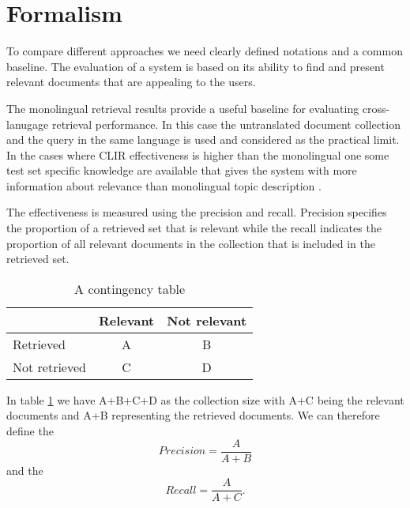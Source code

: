 \documentclass[journal]{IEEEtran}
\begin{document}
\section{Formalism}
To compare different approaches we need clearly defined notations and a common baseline.
The evaluation of a system is based on its ability to find and present relevant documents that are appealing to the users.

The monolingual retrieval results provide a useful baseline for evaluating cross-lanugage retrieval performance.
In this case the untranslated document collection and the query in the same language is used and considered as the practical limit.
In the cases where CLIR effectiveness is higher than the monolingual one some test set specific knowledge are available that gives the system with more information about relevance than monolingual topic description \cite{xu00}.

The effectiveness is measured using the precision and recall.
Precision specifies the proportion of a retrieved set that is relevant while the recall indicates the proportion of all relevant documents in the collection that is included in the retrieved set.

\begin{table}[h]
\caption{A contingency table}
\label{contTable}
\begin{center}
\begin{tabular}{ | l | c | c | }
	\hline
				& Relevant	& Not relevant	\\ \hline
	Retrieved		& A		& B			\\ \hline
	Not retrieved	& C		& D			\\
	\hline
\end{tabular}
\end{center}
\end{table}

In table \ref{contTable} we have A+B+C+D as the collection size with A+C being the relevant documents and A+B representing the retrieved documents.
We can therefore define the
\begin{equation}
\label{precision}
Precision = \frac{A}{A+B}
\end{equation}
and the
\begin{equation}
\label{recall}
Recall = \frac{A}{A+C}.
\end{equation}
\end{document}
